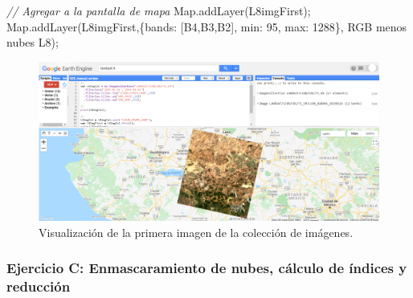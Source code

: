 \documentclass[
  12pt,
  letterpaper,
  twoside]{book}
\newenvironment{Shaded}{\begin{snugshade}}{\end{snugshade}}
\newcommand{\CommentTok}[1]{\textcolor[rgb]{0.24,0.58,0.00}{\textit{#1}}}
\newcommand{\DataTypeTok}[1]{\textcolor[rgb]{0.00,0.00,0.00}{#1}}
\newcommand{\DecValTok}[1]{\textcolor[rgb]{0.28,0.53,0.93}{#1}}
\newcommand{\FunctionTok}[1]{\textcolor[rgb]{0.48,0.12,0.64}{#1}}
\newcommand{\KeywordTok}[1]{\textcolor[rgb]{0.48,0.12,0.64}{#1}}
\newcommand{\NormalTok}[1]{#1}
\newcommand{\OperatorTok}[1]{\textcolor[rgb]{0.00,0.00,0.00}{#1}}
\newcommand{\StringTok}[1]{\textcolor[rgb]{0.87,0.29,0.22}{#1}}
\begin{document}
\begin{Shaded}
\begin{Highlighting}[]
\CommentTok{// Agregar a la pantalla de mapa}
\KeywordTok{Map}\OperatorTok{.}\FunctionTok{addLayer}\NormalTok{(L8imgFirst)}\OperatorTok{;}
\KeywordTok{Map}\OperatorTok{.}\FunctionTok{addLayer}\NormalTok{(L8imgFirst}\OperatorTok{,}\NormalTok{\{}\DataTypeTok{bands}\OperatorTok{:}\NormalTok{ [}\StringTok{\textquotesingle{}B4\textquotesingle{}}\OperatorTok{,}\StringTok{\textquotesingle{}B3\textquotesingle{}}\OperatorTok{,}\StringTok{\textquotesingle{}B2\textquotesingle{}}\NormalTok{]}\OperatorTok{,} \DataTypeTok{min}\OperatorTok{:} \DecValTok{95}\OperatorTok{,} \DataTypeTok{max}\OperatorTok{:} \DecValTok{1288}\NormalTok{\}}\OperatorTok{,} 
  \StringTok{\textquotesingle{}RGB menos nubes L8\textquotesingle{}}\NormalTok{)}\OperatorTok{;}
\end{Highlighting}
\end{Shaded}

\begin{figure}[H]

{\centering \includegraphics[width=0.95\linewidth]{Img/RGBIm} 

}

\caption{Visualización de la primera imagen de la colección de imágenes.}\label{fig:f1016}
\end{figure}

\hypertarget{ejercicio-c-enmascaramiento-de-nubes-cuxe1lculo-de-uxedndices-y-reducciuxf3n}{%
\subsubsection*{Ejercicio C: Enmascaramiento de nubes, cálculo de índices y reducción}\label{ejercicio-c-enmascaramiento-de-nubes-cuxe1lculo-de-uxedndices-y-reducciuxf3n}}
\end{document}
